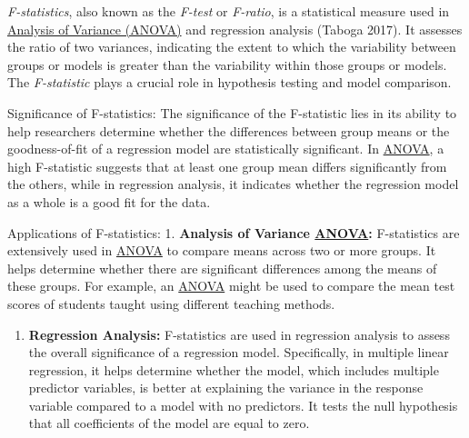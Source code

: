 \documentclass[
  a4paper,
]{scrbook}
\providecommand{\tightlist}{%
  \setlength{\itemsep}{0pt}\setlength{\parskip}{0pt}}\usepackage{longtable,booktabs,array}
\begin{document}
\emph{F-statistics}, also known as the \emph{F-test} or \emph{F-ratio},
is a statistical measure used in \hyperref[acronyms_ANOVA]{Analysis of
Variance (ANOVA)} and regression analysis (Taboga 2017). It assesses the
ratio of two variances, indicating the extent to which the variability
between groups or models is greater than the variability within those
groups or models. The \emph{F-statistic} plays a crucial role in
hypothesis testing and model comparison.

Significance of F-statistics: The significance of the F-statistic lies
in its ability to help researchers determine whether the differences
between group means or the goodness-of-fit of a regression model are
statistically significant. In \hyperref[acronyms_ANOVA]{ANOVA}, a high
F-statistic suggests that at least one group mean differs significantly
from the others, while in regression analysis, it indicates whether the
regression model as a whole is a good fit for the data.

Applications of F-statistics: 1. \textbf{Analysis of Variance
\hyperref[acronyms_ANOVA]{ANOVA}:} F-statistics are extensively used in
\hyperref[acronyms_ANOVA]{ANOVA} to compare means across two or more
groups. It helps determine whether there are significant differences
among the means of these groups. For example, an
\hyperref[acronyms_ANOVA]{ANOVA} might be used to compare the mean test
scores of students taught using different teaching methods.

\begin{enumerate}
\def\labelenumi{\arabic{enumi}.}
\setcounter{enumi}{1}
\tightlist
\item
  \textbf{Regression Analysis:} F-statistics are used in regression
  analysis to assess the overall significance of a regression model.
  Specifically, in multiple linear regression, it helps determine
  whether the model, which includes multiple predictor variables, is
  better at explaining the variance in the response variable compared to
  a model with no predictors. It tests the null hypothesis that all
  coefficients of the model are equal to zero.
\end{enumerate}
\end{document}
